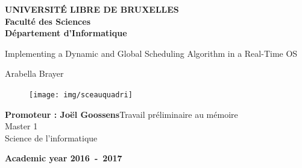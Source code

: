 \documentclass[11pt,a4paper,oneside]{report}
\begin{document}
\begin{titlepage}


\begin{center}
\textbf{UNIVERSITÉ LIBRE DE BRUXELLES}\\
\textbf{Faculté des Sciences}\\
\textbf{Département d'Informatique}
\vfill{}\vfill{}

{\Huge  Implementing a Dynamic and Global Scheduling Algorithm  \vspace*{.5cm}  \linebreak[4] in a Real-Time OS}

{\Huge \par}
\begin{center}{\LARGE Arabella Brayer}\end{center}{\Huge \par}

\vfill{}

\begin{figure}[h]
	\begin{center}
	\texttt{[image: img/sceauquadri]}
	\label{fig:sceauquadri}
	\end{center}
\end{figure}
\vfill{}



\begin{flushright}{\large \textbf{Promoteur : Joël Goossens}}\hfill{}{\large Travail préliminaire au mémoire}\\
{
 }\hfill{}{\large Master 1}\\
\hfill{}{\large Science de l'informatique}\end{flushright}{\large\par}
\vfill{}\vfill{}\enlargethispage{3cm}
\textbf{Academic year 2016~-~2017}
\end{center}
\end{titlepage}
\newpage
\thispagestyle{empty} 
\null

\newenvironment{vcenterpage}
{\newpage\thispagestyle{empty} 
\vspace*{\fill}}
{\vspace*{\fill}\par\pagebreak}


\end{document}

